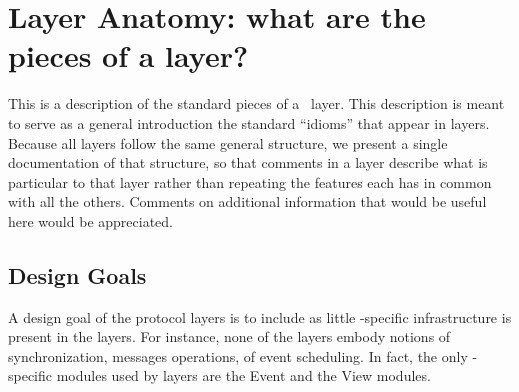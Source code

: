%
%
%
\section{Layer Anatomy: what are the pieces of a layer?}

This is a description of the standard pieces of a \ensemble\ layer.  This
description is meant to serve as a general introduction the standard
``idioms'' that appear in layers.  Because all layers follow the same
general structure, we present a single documentation of that structure, so
that comments in a layer describe what is particular to that layer rather
than repeating the features each has in common with all the others.
Comments on additional information that would be useful here would be
appreciated.

\subsection{Design Goals}

A design goal of the protocol layers is to include as little
\ensemble-specific infrastructure is present in the layers.  For instance,
none of the layers embody notions of synchronization, messages operations,
of event scheduling.  In fact, the only \ensemble-specific modules used by
layers are the Event and the View modules.


